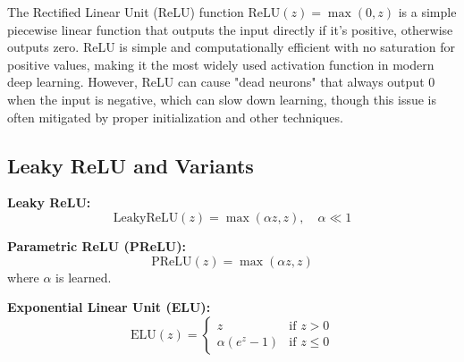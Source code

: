 The Rectified Linear Unit (ReLU) function $\text{ReLU}(z) = \max(0, z)$ is a simple piecewise linear function that outputs the input directly if it's positive, otherwise outputs zero. ReLU is simple and computationally efficient with no saturation for positive values, making it the most widely used activation function in modern deep learning. However, ReLU can cause "dead neurons" that always output 0 when the input is negative, which can slow down learning, though this issue is often mitigated by proper initialization and other techniques.

\subsection{Leaky ReLU and Variants}

\textbf{Leaky ReLU:}
\begin{equation}
\text{LeakyReLU}(z) = \max(\alpha z, z), \quad \alpha \ll 1
\end{equation}

\textbf{Parametric ReLU (PReLU):}
\begin{equation}
\text{PReLU}(z) = \max(\alpha z, z)
\end{equation}
where $\alpha$ is learned.

\textbf{Exponential Linear Unit (ELU):}
\begin{equation}
\text{ELU}(z) = \begin{cases}
z & \text{if } z > 0 \\
\alpha(e^z - 1) & \text{if } z \leq 0
\end{cases}
\end{equation}

